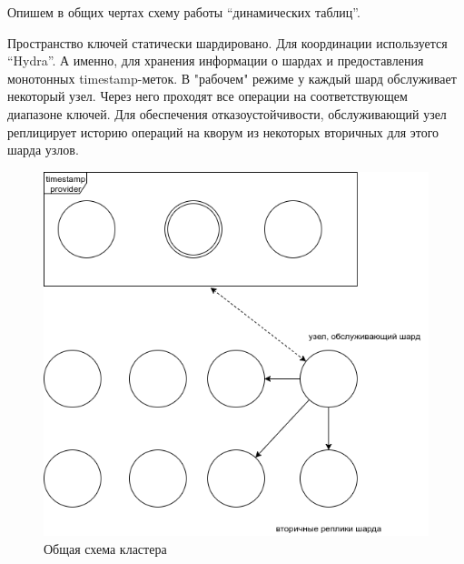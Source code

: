 \documentclass[pdftex,ptm,14pt,a4paper]{extreport}
\theoremstyle{definition}
\begin{document}
Опишем в общих чертах схему работы “динамических таблиц”.

Пространство ключей статически шардировано. Для координации используется “Hydra”.
А именно, для хранения информации о шардах и предоставления монотонных timestamp-меток.
В "рабочем" режиме у каждый шард обслуживает некоторый узел.
Через него проходят все операции на соответствующем диапазоне ключей.
Для обеспечения отказоустойчивости, обслуживающий узел реплицирует историю операций
на кворум из некоторых вторичных для этого шарда узлов.

\begin{figure}[h]
    \centering
    \includegraphics[scale=0.5]{storage.png}
    \caption{Общая схема кластера}
\end{figure}
\end{document}
